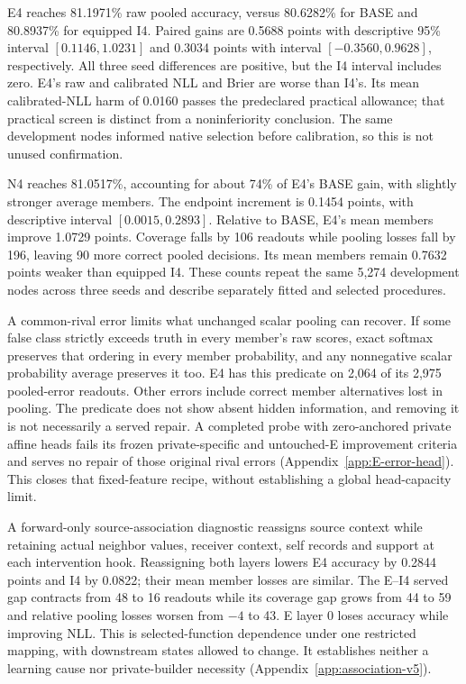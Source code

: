 E4 reaches 81.1971\% raw pooled accuracy, versus 80.6282\% for BASE and 80.8937\% for equipped I4. Paired gains are 0.5688 points with descriptive 95\% interval $[0.1146,1.0231]$ and 0.3034 points with interval $[-0.3560,0.9628]$, respectively. All three seed differences are positive, but the I4 interval includes zero. E4's raw and calibrated NLL and Brier are worse than I4's. Its mean calibrated-NLL harm of 0.0160 passes the predeclared practical allowance; that practical screen is distinct from a noninferiority conclusion. The same development nodes informed native selection before calibration, so this is not unused confirmation.

N4 reaches 81.0517\%, accounting for about 74\% of E4's BASE gain, with slightly stronger average members. The endpoint increment is 0.1454 points, with descriptive interval $[0.0015,0.2893]$. Relative to BASE, E4's mean members improve 1.0729 points. Coverage falls by 106 readouts while pooling losses fall by 196, leaving 90 more correct pooled decisions. Its mean members remain 0.7632 points weaker than equipped I4. These counts repeat the same 5,274 development nodes across three seeds and describe separately fitted and selected procedures.

A common-rival error limits what unchanged scalar pooling can recover. If some false class strictly exceeds truth in every member's raw scores, exact softmax preserves that ordering in every member probability, and any nonnegative scalar probability average preserves it too. E4 has this predicate on 2,064 of its 2,975 pooled-error readouts. Other errors include correct member alternatives lost in pooling. The predicate does not show absent hidden information, and removing it is not necessarily a served repair. A completed probe with zero-anchored private affine heads fails its frozen private-specific and untouched-E improvement criteria and serves no repair of those original rival errors (Appendix~\ref{app:E-error-head}). This closes that fixed-feature recipe, without establishing a global head-capacity limit.

A forward-only source-association diagnostic reassigns source context while retaining actual neighbor values, receiver context, self records and support at each intervention hook. Reassigning both layers lowers E4 accuracy by 0.2844 points and I4 by 0.0822; their mean member losses are similar. The E--I4 served gap contracts from 48 to 16 readouts while its coverage gap grows from 44 to 59 and relative pooling losses worsen from $-4$ to 43. E layer 0 loses accuracy while improving NLL. This is selected-function dependence under one restricted mapping, with downstream states allowed to change. It establishes neither a learning cause nor private-builder necessity (Appendix~\ref{app:association-v5}).

